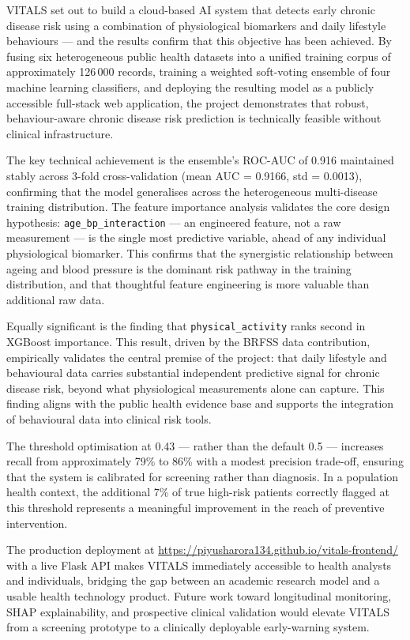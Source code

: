 \documentclass[12pt,a4paper]{report}
\begin{document}
VITALS set out to build a cloud-based AI system that detects early chronic disease risk using a combination of physiological biomarkers and daily lifestyle behaviours — and the results confirm that this objective has been achieved. By fusing six heterogeneous public health datasets into a unified training corpus of approximately 126\,000 records, training a weighted soft-voting ensemble of four machine learning classifiers, and deploying the resulting model as a publicly accessible full-stack web application, the project demonstrates that robust, behaviour-aware chronic disease risk prediction is technically feasible without clinical infrastructure.

The key technical achievement is the ensemble's ROC-AUC of 0.916 maintained stably across 3-fold cross-validation (mean AUC = 0.9166, std = 0.0013), confirming that the model generalises across the heterogeneous multi-disease training distribution. The feature importance analysis validates the core design hypothesis: \texttt{age\_bp\_interaction} — an engineered feature, not a raw measurement — is the single most predictive variable, ahead of any individual physiological biomarker. This confirms that the synergistic relationship between ageing and blood pressure is the dominant risk pathway in the training distribution, and that thoughtful feature engineering is more valuable than additional raw data.

Equally significant is the finding that \texttt{physical\_activity} ranks second in XGBoost importance. This result, driven by the BRFSS data contribution, empirically validates the central premise of the project: that daily lifestyle and behavioural data carries substantial independent predictive signal for chronic disease risk, beyond what physiological measurements alone can capture. This finding aligns with the public health evidence base and supports the integration of behavioural data into clinical risk tools.

The threshold optimisation at 0.43 — rather than the default 0.5 — increases recall from approximately 79\% to 86\% with a modest precision trade-off, ensuring that the system is calibrated for screening rather than diagnosis. In a population health context, the additional 7\% of true high-risk patients correctly flagged at this threshold represents a meaningful improvement in the reach of preventive intervention.

The production deployment at \url{https://piyusharora134.github.io/vitals-frontend/} with a live Flask API makes VITALS immediately accessible to health analysts and individuals, bridging the gap between an academic research model and a usable health technology product. Future work toward longitudinal monitoring, SHAP explainability, and prospective clinical validation would elevate VITALS from a screening prototype to a clinically deployable early-warning system.
\end{document}
